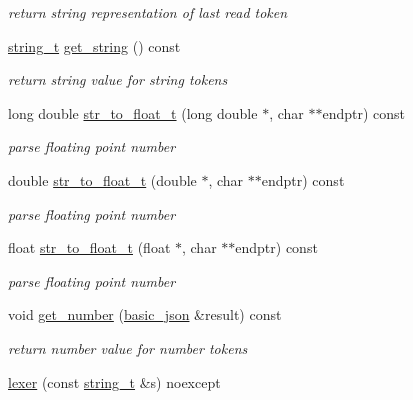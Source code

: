 \begin{DoxyCompactItemize}
\begin{DoxyCompactList}\small\item\em return string representation of last read token \end{DoxyCompactList}\item 
\hyperlink{classnlohmann_1_1basic__json_ab63e618bbb0371042b1bec17f5891f42_ab63e618bbb0371042b1bec17f5891f42}{string\-\_\-t} \hyperlink{classnlohmann_1_1basic__json_1_1lexer_a18dc059f3a96af88104ca02d919c16b5_a18dc059f3a96af88104ca02d919c16b5}{get\-\_\-string} () const 
\begin{DoxyCompactList}\small\item\em return string value for string tokens \end{DoxyCompactList}\item 
long double \hyperlink{classnlohmann_1_1basic__json_1_1lexer_a541f1cd06178fefc5ddde34022852c10_a541f1cd06178fefc5ddde34022852c10}{str\-\_\-to\-\_\-float\-\_\-t} (long double $\ast$, char $\ast$$\ast$endptr) const 
\begin{DoxyCompactList}\small\item\em parse floating point number \end{DoxyCompactList}\item 
double \hyperlink{classnlohmann_1_1basic__json_1_1lexer_a29d53d1c76a58b7f4d1315d44665eab3_a29d53d1c76a58b7f4d1315d44665eab3}{str\-\_\-to\-\_\-float\-\_\-t} (double $\ast$, char $\ast$$\ast$endptr) const 
\begin{DoxyCompactList}\small\item\em parse floating point number \end{DoxyCompactList}\item 
float \hyperlink{classnlohmann_1_1basic__json_1_1lexer_aea092725cd2b01e84126898f080418d6_aea092725cd2b01e84126898f080418d6}{str\-\_\-to\-\_\-float\-\_\-t} (float $\ast$, char $\ast$$\ast$endptr) const 
\begin{DoxyCompactList}\small\item\em parse floating point number \end{DoxyCompactList}\item 
void \hyperlink{classnlohmann_1_1basic__json_1_1lexer_a3a9787fee5177c60bbc80d9e41282e9f_a3a9787fee5177c60bbc80d9e41282e9f}{get\-\_\-number} (\hyperlink{classnlohmann_1_1basic__json}{basic\-\_\-json} \&result) const 
\begin{DoxyCompactList}\small\item\em return number value for number tokens \end{DoxyCompactList}\item 
\hypertarget{classnlohmann_1_1basic__json_1_1lexer_a4b09fcd209c514976c530257f092bcd0_a4b09fcd209c514976c530257f092bcd0}{\hyperlink{classnlohmann_1_1basic__json_1_1lexer_a4b09fcd209c514976c530257f092bcd0_a4b09fcd209c514976c530257f092bcd0}{lexer} (const \hyperlink{classnlohmann_1_1basic__json_ab63e618bbb0371042b1bec17f5891f42_ab63e618bbb0371042b1bec17f5891f42}{string\-\_\-t} \&s) noexcept}\label{classnlohmann_1_1basic__json_1_1lexer_a4b09fcd209c514976c530257f092bcd0_a4b09fcd209c514976c530257f092bcd0}


\end{DoxyCompactItemize}
